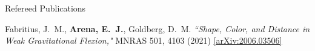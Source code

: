\documentclass{resume} %
\begin{document}

\begin{rSection}{Refereed Publications}

\begin{etaremune}
\item {Fabritius}, J.~M., \textbf{{Arena}, E.~J.}, {Goldberg}, D.~M. \textit{``Shape, Color, and Distance in Weak Gravitational Flexion,"} MNRAS 501, 4103 (2021) \href{https://arxiv.org/abs/2006.03506}{[arXiv:2006.03506]}
\end{etaremune}

\end{rSection}

\end{document}
